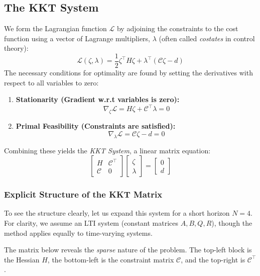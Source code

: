 \subsection{The KKT System}
We form the Lagrangian function $\mathcal{L}$ by adjoining the constraints to the cost function using a vector of Lagrange multipliers, $\lambda$ (often called \textit{costates} in control theory):
\begin{equation}
	\mathcal{L}(\zeta, \lambda) = \frac{1}{2}\zeta^\top H \zeta + \lambda^\top(\mathcal{C}\zeta - d)
\end{equation}
The necessary conditions for optimality are found by setting the derivatives with respect to all variables to zero:

\begin{enumerate}
	\item \textbf{Stationarity (Gradient w.r.t variables is zero):} 
	\[ \nabla_\zeta \mathcal{L} = H\zeta + \mathcal{C}^\top \lambda = 0 \]
	\item \textbf{Primal Feasibility (Constraints are satisfied):} 
	\[ \nabla_\lambda \mathcal{L} = \mathcal{C}\zeta - d = 0 \]
\end{enumerate}

Combining these yields the \emph{KKT System}, a linear matrix equation:
\begin{equation*}
	\begin{bmatrix}
		H & \mathcal{C}^\top \\
		\mathcal{C} & 0
	\end{bmatrix}
	\begin{bmatrix}
		\zeta \\ \lambda
	\end{bmatrix}
	=
	\begin{bmatrix}
		0 \\ d
	\end{bmatrix}
\end{equation*}

\subsubsection*{Explicit Structure of the KKT Matrix}
To see the structure clearly, let us expand this system for a short horizon $N=4$. For clarity, we assume an {LTI system} (constant matrices $A, B, Q, R$), though the method applies equally to time-varying systems.

The matrix below reveals the \emph{sparse} nature of the problem. The top-left block is the Hessian $H$, the bottom-left is the constraint matrix $\mathcal{C}$, and the top-right is $\mathcal{C}^\top$.

